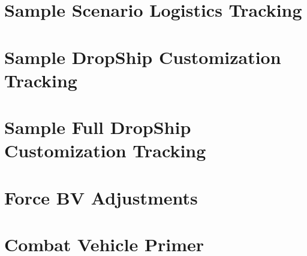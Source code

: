 \documentclass{article}
\begin{document}
\section{Sample Scenario Logistics Tracking}



\newpage

\section{Sample DropShip Customization Tracking}



\newpage

\section{Sample Full DropShip Customization Tracking}



\newpage

\section{Force BV Adjustments}
\label{sec:force_bv_adjustments}



\newpage

\section{Combat Vehicle Primer}
\label{sec:combat_vehicle_primer}
\end{document}
